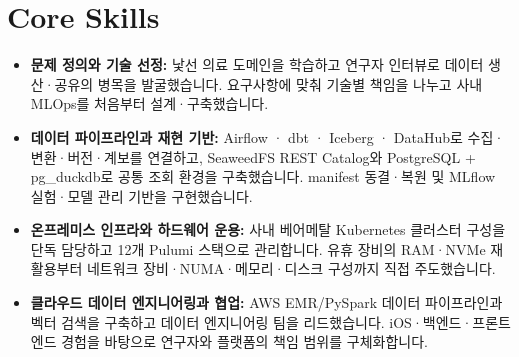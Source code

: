 \section{Core Skills}
\begin{itemize}[leftmargin=0.15in, label={}]
\item{\textbf{문제 정의와 기술 선정:} 낯선 의료 도메인을 학습하고 연구자 인터뷰로 데이터 생산·공유의 병목을 발굴했습니다. 요구사항에 맞춰 기술별 책임을 나누고 사내 MLOps를 처음부터 설계·구축했습니다.}
\item{\textbf{데이터 파이프라인과 재현 기반:} Airflow · dbt · Iceberg · DataHub로 수집·변환·버전·계보를 연결하고, SeaweedFS REST Catalog와 PostgreSQL + pg\_duckdb로 공통 조회 환경을 구축했습니다. manifest 동결·복원 및 MLflow 실험·모델 관리 기반을 구현했습니다.}
\item{\textbf{온프레미스 인프라와 하드웨어 운용:} 사내 베어메탈 Kubernetes 클러스터 구성을 단독 담당하고 12개 Pulumi 스택으로 관리합니다. 유휴 장비의 RAM·NVMe 재활용부터 네트워크 장비·NUMA·메모리·디스크 구성까지 직접 주도했습니다.}
\item{\textbf{클라우드 데이터 엔지니어링과 협업:} AWS EMR/PySpark 데이터 파이프라인과 벡터 검색을 구축하고 데이터 엔지니어링 팀을 리드했습니다. iOS·백엔드·프론트엔드 경험을 바탕으로 연구자와 플랫폼의 책임 범위를 구체화합니다.}
\end{itemize}

